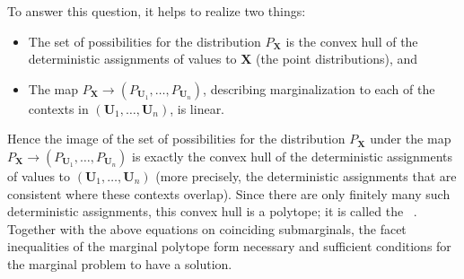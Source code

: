 {To answer this question, it helps to realize two things:
\begin{itemize}
	\item The set of possibilities for the distribution $P_{\bm{X}}$ is the convex hull of the deterministic assignments of values to $\bm{X}$ (the point distributions), and 
	\item The map $P_{\bm{X}}\to (P_{\bm{U}_1},\ldots,P_{\bm{U}_n})$, describing marginalization to each of the contexts in $(\bm{U}_1,\ldots,\bm{U}_n)$, is linear.
\end{itemize}
Hence the image of the set of possibilities for the distribution $P_{\bm{X}}$ under the map $P_{\bm{X}}\to (P_{\bm{U}_1},\ldots,P_{\bm{U}_n})$ is exactly the convex hull of the deterministic assignments of values to $(\bm{U}_1,\ldots,\bm{U}_n)$ (more precisely, the deterministic assignments that are consistent where these contexts overlap). Since there are only finitely many such deterministic assignments, this convex hull is a polytope; it is called the ~\cite{kahle_marginal_2010}. Together with the above equations on coinciding submarginals, the facet inequalities of the marginal polytope form necessary and sufficient conditions for the marginal problem to have a solution.




}
